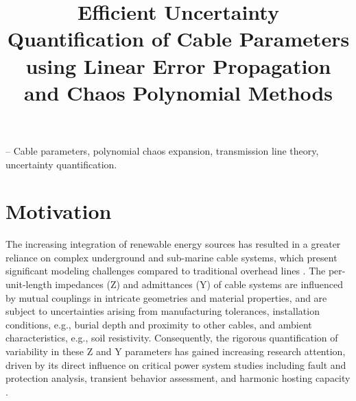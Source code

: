 \documentclass{IEEEtran4PSCC}
\begin{document}
\onecolumn
\title{ Efficient Uncertainty Quantification of Cable Parameters using Linear Error Propagation and Chaos Polynomial Methods}

\author{ 
}

\maketitle

\vspace{-.5cm}{\it Index terms} -- Cable parameters, polynomial chaos expansion, transmission line theory, uncertainty quantification.

\section{Motivation}
The increasing integration of renewable energy sources has resulted in a greater reliance on complex underground and sub-marine cable systems, which present significant modeling challenges compared to traditional overhead lines \cite{Karmokar2025}. The per-unit-length impedances (Z) and admittances (Y) of cable systems are influenced by mutual couplings in intricate geometries and material properties, and are subject to uncertainties arising from manufacturing tolerances, installation conditions, e.g., burial depth and proximity to other cables, and ambient characteristics, e.g., soil resistivity. Consequently, the rigorous quantification of variability in these Z and Y parameters has gained increasing research attention, driven by its direct influence on critical power system studies including fault and protection analysis, transient behavior assessment, and harmonic hosting capacity \cite{tom_van_acker_impact_2025}.
\end{document}
